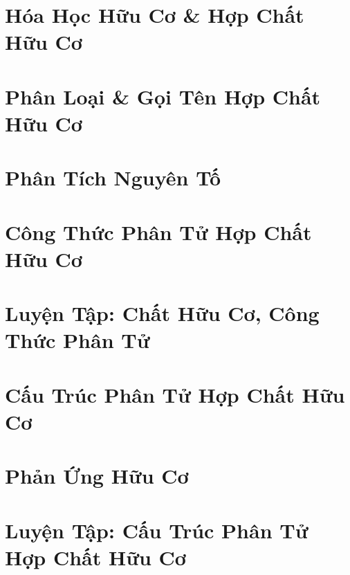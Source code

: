 \documentclass[oneside]{book}
\numberwithin{equation}{section}
\begin{document}
\section{Hóa Học Hữu Cơ \& Hợp Chất Hữu Cơ}


\section{Phân Loại \& Gọi Tên Hợp Chất Hữu Cơ}


\section{Phân Tích Nguyên Tố}


\section{Công Thức Phân Tử Hợp Chất Hữu Cơ}


\section{Luyện Tập: Chất Hữu Cơ, Công Thức Phân Tử}


\section{Cấu Trúc Phân Tử Hợp Chất Hữu Cơ}


\section{Phản Ứng Hữu Cơ}


\section{Luyện Tập: Cấu Trúc Phân Tử Hợp Chất Hữu Cơ}
\end{document}

